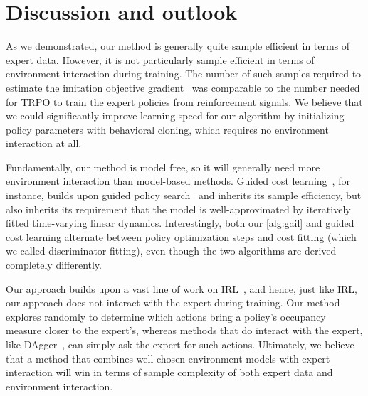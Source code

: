 \documentclass{article}
\newcommand{\1}{\mathbb{I}} %
\begin{document}
\section{Discussion and outlook}

As we demonstrated, our method is generally quite sample efficient in terms of expert data.
However, it is not particularly sample efficient in terms of environment interaction during training.
The number of such samples required to estimate the imitation objective gradient~ was comparable to
the number needed for TRPO to train the expert policies from reinforcement signals.
We believe that we could significantly improve learning speed for our algorithm by initializing policy parameters with behavioral cloning, which requires no environment interaction at all.

Fundamentally, our method is model free, so it will generally need more environment interaction than model-based methods.
Guided cost learning~\citep{finn2016guided}, for instance, builds upon guided policy search~\citep{levine2014learning} and inherits its sample efficiency, but also inherits its requirement that the model is well-approximated by iteratively fitted time-varying linear dynamics.
Interestingly, both our \cref{alg:gail} and guided cost learning alternate between policy optimization steps and cost fitting (which we called discriminator fitting), even though the two algorithms are derived completely differently.

Our approach builds upon a vast line of work on IRL~\citep{ziebart2008maximum,abbeel2004apprenticeship,syed2008apprenticeship,syed2007game}, and hence, just like IRL, our approach does not interact with the expert during training.
Our method explores randomly to determine which actions bring a policy's occupancy measure closer to the expert's, whereas methods that do interact with the expert, like DAgger~\citep{ross2011reduction}, can simply ask the expert for such actions.
Ultimately, we believe that a method that combines well-chosen environment models with expert interaction  will win in terms of sample complexity of both expert data and environment interaction.

\end{document}
